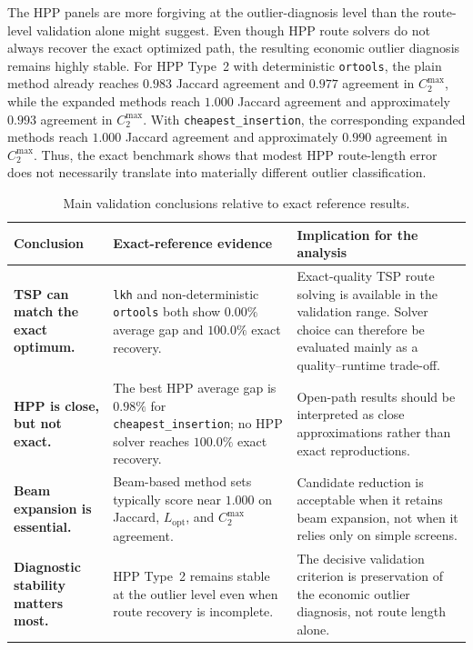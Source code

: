 \documentclass[preprint,12pt]{elsarticle}
\begin{document}
The HPP panels are more forgiving at the outlier-diagnosis level than the route-level validation alone might suggest. Even though HPP route solvers do not always recover the exact optimized path, the resulting economic outlier diagnosis remains highly stable. For HPP Type~2 with deterministic \texttt{ortools}, the plain method already reaches $0.983$ Jaccard agreement and $0.977$ agreement in $C_2^{\max}$, while the expanded methods reach $1.000$ Jaccard agreement and approximately $0.993$ agreement in $C_2^{\max}$. With \texttt{cheapest\_insertion}, the corresponding expanded methods reach $1.000$ Jaccard agreement and approximately $0.990$ agreement in $C_2^{\max}$. Thus, the exact benchmark shows that modest HPP route-length error does not necessarily translate into materially different outlier classification.

\begin{table}[htbp]
\centering
\caption{Main validation conclusions relative to exact reference results.}
\label{tab:validation-conclusions}
\small
\renewcommand{\arraystretch}{1.18}
\begin{tabular}{@{}>{\raggedright\arraybackslash}p{}@{\hspace{1em}}>{\raggedright\arraybackslash}p{}@{\hspace{1em}}>{\raggedright\arraybackslash}p{}@{}}
\toprule
Conclusion & Exact-reference evidence & Implication for the analysis \\
\midrule
\textbf{TSP can match the exact optimum.} & \texttt{lkh} and non-deterministic \texttt{ortools} both show $0.00\%$ average gap and $100.0\%$ exact recovery. & Exact-quality TSP route solving is available in the validation range. Solver choice can therefore be evaluated mainly as a quality--runtime trade-off. \\
\addlinespace
\textbf{HPP is close, but not exact.} & The best HPP average gap is $0.98\%$ for \texttt{cheapest\_insertion}; no HPP solver reaches $100.0\%$ exact recovery. & Open-path results should be interpreted as close approximations rather than exact reproductions. \\
\addlinespace
\textbf{Beam expansion is essential.} & Beam-based method sets typically score near $1.000$ on Jaccard, $L_{\mathrm{opt}}$, and $C_2^{\max}$ agreement. & Candidate reduction is acceptable when it retains beam expansion, not when it relies only on simple screens. \\
\addlinespace
\textbf{Diagnostic stability matters most.} & HPP Type~2 remains stable at the outlier level even when route recovery is incomplete. & The decisive validation criterion is preservation of the economic outlier diagnosis, not route length alone. \\
\bottomrule
\end{tabular}
\par
\end{table}
\end{document}
